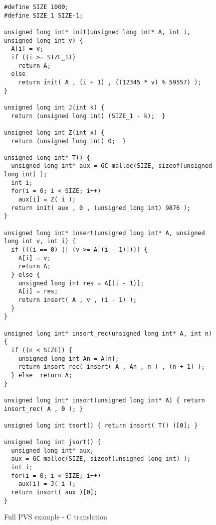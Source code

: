 \documentclass[12pt,a4paper]{article}
\begin{document}
\begin{figure}
\begin{lstlisting}
#define SIZE 1000;
#define SIZE_1 SIZE-1;

unsigned long int* init(unsigned long int* A, int i, unsigned long int v) {
  A[i] = v;
  if ((i >= SIZE_1))
    return A;
  else
    return init( A , (i + 1) , ((12345 * v) % 59557) );
}

unsigned long int J(int k) {
  return (unsigned long int) (SIZE_1 - k);  }

unsigned long int Z(int x) {
  return (unsigned long int) 0;  }

unsigned long int* T() {
  unsigned long int* aux = GC_malloc(SIZE, sizeof(unsigned long int) );
  int i;
  for(i = 0; i < SIZE; i++)
    aux[i] = Z( i );
  return init( aux , 0 , (unsigned long int) 9876 );
}

unsigned long int* insert(unsigned long int* A, unsigned long int v, int i) {
  if (((i == 0) || (v >= A[(i - 1)]))) {
    A[i] = v;
    return A;
  } else {
    unsigned long int res = A[(i - 1)];
    A[i] = res;
    return insert( A , v , (i - 1) );
  }
}

unsigned long int* insort_rec(unsigned long int* A, int n) {
  if ((n < SIZE)) {
    unsigned long int An = A[n];
    return insort_rec( insert( A , An , n ) , (n + 1) );
  } else  return A;
}

unsigned long int* insort(unsigned long int* A) { return insort_rec( A , 0 ); }

unsigned long int tsort() { return insort( T() )[0]; }

unsigned long int jsort() {
  unsigned long int* aux;
  aux = GC_malloc(SIZE, sizeof(unsigned long int) );
  int i;
  for(i = 0; i < SIZE; i++)
    aux[i] = J( i );
  return insort( aux )[0];
}
\end{lstlisting}
\caption{Full PVS example - C translation}
\label{fig:Cbenchmark}
\end{figure}
\end{document}
